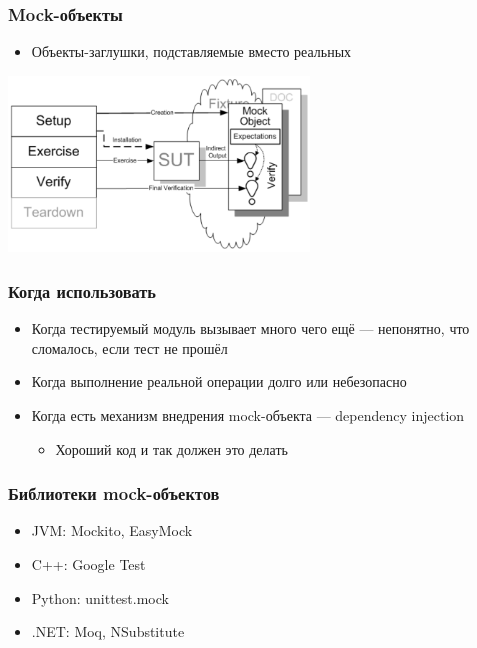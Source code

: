 \documentclass{../../slides-style}
\begin{document}
    \begin{frame}
        \frametitle{Mock-объекты}
        \begin{itemize}
            \item Объекты-заглушки, подставляемые вместо реальных
        \end{itemize}
        \begin{center}
            \includegraphics[width=0.6\textwidth]{mock.png}
        \end{center}
    \end{frame}

    \begin{frame}
        \frametitle{Когда использовать}
        \begin{itemize}
            \item Когда тестируемый модуль вызывает много чего ещё --- непонятно, что сломалось, если тест не прошёл
            \item Когда выполнение реальной операции долго или небезопасно
            \item Когда есть механизм внедрения mock-объекта --- dependency injection
            \begin{itemize}
                \item Хороший код и так должен это делать
            \end{itemize}
        \end{itemize}
    \end{frame}

    \begin{frame}
        \frametitle{Библиотеки mock-объектов}
        \begin{itemize}
            \item JVM: Mockito, EasyMock
            \item C++: Google Test
            \item Python: unittest.mock
            \item .NET: Moq, NSubstitute
        \end{itemize}
    \end{frame}
\end{document}
